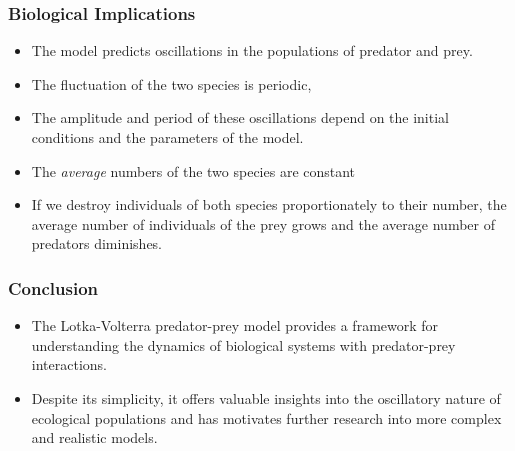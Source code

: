 \begin{frame}
    \frametitle{Biological Implications}
    \begin{itemize}
        \item The model predicts oscillations in the populations of predator and prey.
        \item The fluctuation of the two species is periodic,
    \item The amplitude and period of these oscillations depend on the initial conditions and the parameters of the model.
    \item  The \textit{average} numbers of the two species are constant
    \item  If we  destroy individuals of both species  proportionately to their number, the average number of individuals of the prey grows and the average number of predators diminishes.
    \end{itemize}
\end{frame}


\begin{frame}
    \frametitle{Conclusion}
    \begin{itemize}
        \item The Lotka-Volterra predator-prey model provides a  framework for understanding the dynamics of biological systems with predator-prey interactions.
        \item Despite its simplicity, it offers valuable insights into the oscillatory nature of ecological populations and has motivates further research into more complex and realistic models.
    \end{itemize}
\end{frame}

